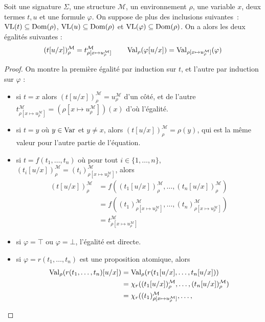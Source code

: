 \begin{proposition}\label{prop.comm.subst.env}
  Soit une signature $\Sigma$, une structure $\mathcal M$, un environnement
  $\rho$, une variable $x$, deux termes $t,u$ et une formule $\varphi$. On
  suppose de plus des inclusions suivantes~: $\operatorname{VL}(t)\subseteq \operatorname{Dom}(\rho)$,
  $\operatorname{VL}(u)\subseteq\operatorname{Dom}(\rho)$ et $\operatorname{VL}(\varphi)\subseteq\operatorname{Dom}(\rho)$. On a alors
  les deux égalités suivantes :
  \[(t[u/x])_\rho^\mathcal M = t^\mathcal M_{\rho[x \mapsto u^\mathcal M_\rho]} \qquad
  \operatorname{Val}_\rho(\varphi[u/x]) = \operatorname{Val}_{\rho[x\mapsto u^\mathcal M_\rho]}(\varphi)\]
\end{proposition}

\begin{proof}
  On montre la première égalité par induction sur $t$, et l'autre par induction
  sur $\varphi$ :
  \begin{itemize}
  \item si $t = x$ alors $(t[u/x])_\rho^\mathcal M = u^\mathcal M_\rho$ d'un côté,
    et de l'autre
    $t^\mathcal M_{\rho[x\mapsto u_\rho^\mathcal M]} =
    (\rho[x\mapsto u_\rho^\mathcal M])(x)$
    d'où l'égalité.
  \item si $t = y$ où $y\in\operatorname{Var}$ et $y\neq x$, alors
    $(t[u/x])_\rho^\mathcal M = \rho(y)$, qui est la même valeur pour l'autre
    partie de l'équation.
  \item si $t = f(t_1,\ldots,t_n)$ où pour tout $i\in\{1,\ldots,n\}$,
    $(t_i[u/x])^\mathcal M_\rho = (t_i)^\mathcal M_{\rho[x\mapsto u^\mathcal M_\rho]}$, alors
    \begin{align*}
      (t[u/x])^\mathcal M_\rho &= f((t_1[u/x])^\mathcal M_\rho,\ldots,
      (t_n[u/x])^\mathcal M_\rho)\\
      &= f((t_1)^\mathcal M_{\rho[x\mapsto u^\mathcal M_\rho]},\ldots,
      (t_n)^\mathcal M_{\rho[x\mapsto u^\mathcal M_\rho]})\\
      &= t^\mathcal M_{\rho[x\mapsto u^\mathcal M_\rho]}
    \end{align*}
  \item si $\varphi = \top$ ou $\varphi = \bot$, l'égalité est directe.
  \item si $\varphi = r(t_1,\ldots,t_n)$ est une proposition atomique, alors
    \begin{align*}
      \Val_\rho(r(t_1,\ldots,t_n)[u/x])
      &= \Val_\rho(r(t_1[u/x],\ldots,t_n[u/x]))\\
      &= \chi_r((t_1[u/x])^\mathcal M_\rho,\ldots,(t_n[u/x])^\mathcal M_\rho)\\
      &= \chi_r((t_1)^\mathcal M_{\rho[x\mapsto u^\mathcal M_\rho]},\ldots,

\end{align*}
\end{itemize}
\end{proof}
